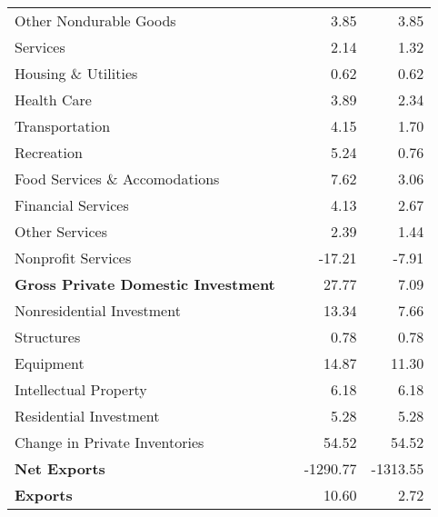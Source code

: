 \documentclass[11pt, letterpaper]{article}\usepackage[]{graphicx}\usepackage[]{color}
\begin{document}
\begin{table}[H]
\begin{tabular}{lrrr}
  \hspace{24mm}  Other Nondurable Goods &  & 3.85 & 3.85 \\ 
  \hspace{8mm}  Services &  & 2.14 & 1.32 \\ 
  \hspace{16mm}  Housing \& Utilities &  & 0.62 & 0.62 \\ 
  \hspace{16mm}  Health Care &  & 3.89 & 2.34 \\ 
  \hspace{16mm}  Transportation &  & 4.15 & 1.70 \\ 
  \hspace{16mm}  Recreation &  & 5.24 & 0.76 \\ 
  \hspace{16mm}  Food Services \& Accomodations &  & 7.62 & 3.06 \\ 
  \hspace{16mm}  Financial Services &  & 4.13 & 2.67 \\ 
  \hspace{16mm}  Other Services &  & 2.39 & 1.44 \\ 
  \hspace{16mm}  Nonprofit Services &  & -17.21 & -7.91 \\ 
  \hspace{0mm} \textbf{Gross Private Domestic Investment} &  & 27.77 & 7.09 \\ 
  \hspace{8mm}  Nonresidential Investment &  & 13.34 & 7.66 \\ 
  \hspace{16mm}  Structures &  & 0.78 & 0.78 \\ 
  \hspace{16mm}  Equipment &  & 14.87 & 11.30 \\ 
  \hspace{16mm}  Intellectual Property &  & 6.18 & 6.18 \\ 
  \hspace{8mm}  Residential Investment &  & 5.28 & 5.28 \\ 
  \hspace{8mm}  Change in Private Inventories &  & 54.52 & 54.52 \\ 
  \hspace{0mm} \textbf{Net Exports} &  & -1290.77 & -1313.55 \\ 
  \hspace{0mm} \textbf{Exports} &  & 10.60 & 2.72 \\ 

\end{tabular}
\end{table}
\end{document}
